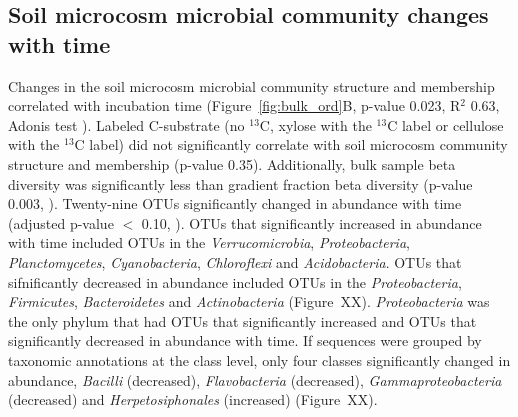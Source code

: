 \subsection{Soil microcosm microbial community changes with time}
Changes in the soil microcosm microbial community structure and membership
correlated with incubation time (Figure~\ref{fig:bulk_ord}B, p-value 0.023,
R$^{2}$ 0.63, Adonis test \citet{Anderson2001a}). Labeled C-substrate (no
$^{13}$C, xylose with the $^{13}$C label or cellulose with the
$^{13}$C label) did not significantly correlate with soil microcosm community
structure and membership (p-value 0.35). Additionally, bulk sample beta
diversity was significantly less than gradient fraction beta diversity (p-value
0.003, \citet{Anderson2006}). Twenty-nine OTUs significantly changed in
abundance with time (adjusted p-value $<$ 0.10, \citet{YBenjamini1995}). OTUs
that significantly increased in abundance with time included OTUs in the
\textit{Verrucomicrobia}, \textit{Proteobacteria}, \textit{Planctomycetes},
\textit{Cyanobacteria}, \textit{Chloroflexi} and \textit{Acidobacteria}. OTUs
that sifnificantly decreased in abundance included OTUs in the
\textit{Proteobacteria}, \textit{Firmicutes}, \textit{Bacteroidetes} and
\textit{Actinobacteria} (Figure~XX).  \textit{Proteobacteria} was the only
phylum that had OTUs that significantly increased and OTUs that significantly
decreased in abundance with time. If sequences were grouped by taxonomic
annotations at the class level, only four classes significantly changed in
abundance, \textit{Bacilli} (decreased), \textit{Flavobacteria} (decreased),
\textit{Gammaproteobacteria} (decreased) and \textit{Herpetosiphonales}
(increased) (Figure~XX). 
